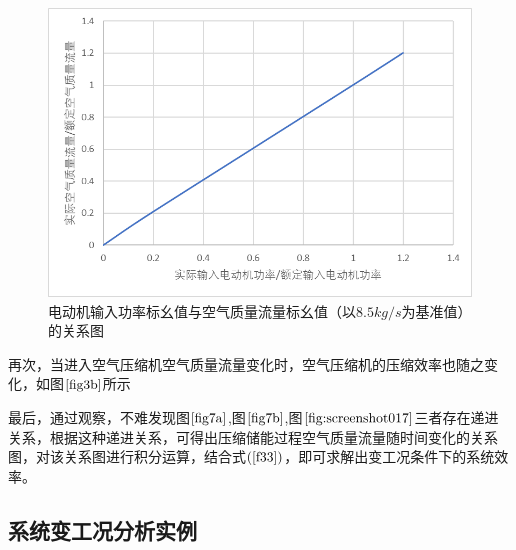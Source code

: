 \documentclass{jnuthesis}
\begin{document}
	\begin{figure}[H]
		\centering
		\includegraphics[width=0.7\linewidth]{pictures/screenshot017}
		\caption{\fontsize{10.5bp}{10pt}电动机输入功率标幺值与空气质量流量标幺值（以$ 8.5kg/s $为基准值）的关系图}
		\label{fig:screenshot017}
	\end{figure}
	
	\par 再次，当进入空气压缩机空气质量流量变化时，空气压缩机的压缩效率也随之变化，如图$ \fontsize{10.5bp}{10pt}\ref{fig3b} $所示
	\par 最后，通过观察，不难发现图$ \fontsize{10.5bp}{10pt}\ref{fig7a} $,图$ \fontsize{10.5bp}{10pt}\ref{fig7b} $,图$ \fontsize{10.5bp}{10pt}\ref{fig:screenshot017} $三者存在递进关系，根据这种递进关系，可得出压缩储能过程空气质量流量随时间变化的关系图，对该关系图进行积分运算，结合式$ (\fontsize{10.5bp}{10pt}\ref{f33}) $，即可求解出变工况条件下的系统效率。\\
	
	\subsection{系统变工况分析实例}
	
\end{document}
